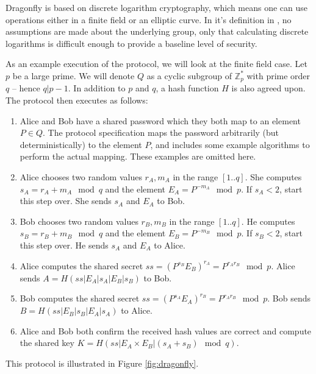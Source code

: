 
Dragonfly is based on discrete logarithm cryptography, which means one can use operations either in a finite field
or an elliptic curve. In it's definition in \cite{Ha15}, no assumptions are made about the underlying group, only that
calculating discrete logarithms is difficult enough to provide a baseline level of security.

As an example execution of the protocol, we will look at the finite field case. Let $p$ be a large prime. We will denote $Q$ as a cyclic subgroup
of $\mathbb{Z}_p^*$ with prime order $q$ -- hence $q | p-1$. In addition to $p$ and $q$, a hash function $H$ is also agreed upon.
The protocol then executes as follows:

\begin{enumerate}
    \item Alice and Bob have a shared password which they both map to an element $P \in Q$. The protocol specification maps the password
        arbitrarily (but deterministically) to the element $P$, and includes some example algorithms to perform the actual mapping. These
        examples are omitted here.
    \item Alice chooses two random values $r_A, m_A$ in the range $[1..q]$. She computes $s_A = r_A + m_A \mod q$ and the element
        $E_A = P^{-m_A} \mod p$. If $s_A < 2$, start this step over. She sends $s_A$ and $E_A$ to Bob.  \label{enum:dragonfly2}
    \item Bob chooses two random values $r_B, m_B$ in the range $[1..q]$. He computes $s_B = r_B + m_B \mod q$ and the element
        $E_B = P^{-m_B} \mod p$. If $s_B < 2$, start this step over. He sends $s_A$ and $E_A$ to Alice. \label{enum:dragonfly3}
    \item Alice computes the shared secret $ss = (P^{s_B} E_B)^{r_A} = P^{r_A r_B} \mod p$. Alice sends $A = H(ss | E_A | s_A | E_B | s_B)$ to Bob.
    \item Bob computes the shared secret $ss = (P^{s_A} E_A)^{r_B} = P^{r_A r_B} \mod p$. Bob sends $B = H(ss | E_B | s_B | E_A | s_A)$ to Alice.
    \item Alice and Bob both confirm the received hash values are correct and compute the shared key $K = H(ss | E_A \times E_B | (s_A + s_B) \mod q)$.
\end{enumerate}

This protocol is illustrated in Figure \ref{fig:dragonfly}.

